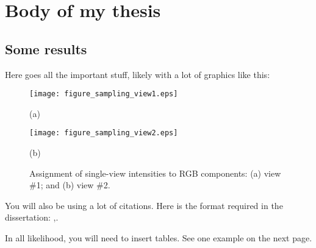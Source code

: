 \chapter{Body of my thesis}
\label{chapter:body}
\thispagestyle{myheadings}

\graphicspath{{3_Body/Figures/}}

\section{Some results}
\label{sec:results}

Here goes all the important stuff, likely with a lot of graphics like this:

\begin{figure}[htb]
  \begin{minipage}[t]{0.49\linewidth}\centering
    \texttt{[image: figure\_sampling\_view1.eps]}
    \medskip
    \centerline{(a)}
  \end{minipage}\hfill
  \begin{minipage}[t]{0.49\linewidth}\centering
    \texttt{[image: figure\_sampling\_view2.eps]}
    \medskip
    \centerline{(b)}
  \end{minipage}
  \caption{Assignment of single-view intensities to RGB components: (a) view
    \#1; and (b) view \#2. }
  \label{fig:Sampling}
\end{figure}

You will also be using a lot of citations. Here is the format required in the dissertation: \cite{lamport1985:latex},\cite{Debr01}.

In all likelihood, you will need to insert tables. See one example on the next page.
\clearpage

